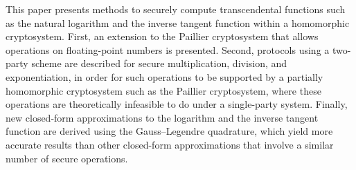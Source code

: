 This paper presents methods to securely compute transcendental functions such as the natural logarithm and the inverse tangent function within a homomorphic cryptosystem.
First, an extension to the Paillier cryptosystem that allows operations on floating-point numbers is presented. 
Second, protocols using a two-party scheme are described for secure multiplication, division, and exponentiation, in order for such operations to be supported by a partially homomorphic cryptosystem such as the Paillier cryptosystem, where these operations are theoretically infeasible to do under a single-party system.
Finally, new closed-form approximations to the logarithm and the inverse tangent function are derived using the Gauss--Legendre quadrature, which yield more accurate results than other closed-form approximations that involve a similar number of secure operations.
